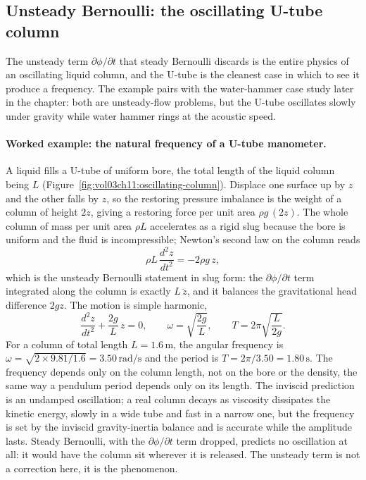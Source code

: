 \subsection{Unsteady Bernoulli: the oscillating U-tube column}

The unsteady term $\partial\phi/\partial t$ that steady Bernoulli
discards is the entire physics of an oscillating liquid column, and
the U-tube is the cleanest case in which to see it produce a
frequency. The example pairs with the water-hammer case study later in
the chapter: both are unsteady-flow problems, but the U-tube oscillates
slowly under gravity while water hammer rings at the acoustic speed.



\paragraph{Worked example: the natural frequency of a U-tube
manometer.} A liquid fills a U-tube of uniform bore, the total length
of the liquid column being $L$ (Figure~\ref{fig:vol03ch11:oscillating-column}).
Displace one surface up by $z$ and the other falls by $z$, so the
restoring pressure imbalance is the weight of a column of height $2z$,
giving a restoring force per unit area $\rho g\,(2z)$. The whole
column of mass per unit area $\rho L$ accelerates as a rigid slug
because the bore is uniform and the fluid is incompressible; Newton's
second law on the column reads
\[
\rho L\,\frac{d^2 z}{dt^2} = -2\rho g\,z,
\]
which is the unsteady Bernoulli statement in slug form: the
$\partial\phi/\partial t$ term integrated along the column is exactly
$L\,\ddot z$, and it balances the gravitational head difference
$2gz$. The motion is simple harmonic,
\[
\frac{d^2 z}{dt^2} + \frac{2g}{L}\,z = 0,
\qquad
\omega = \sqrt{\frac{2g}{L}},
\qquad
T = 2\pi\sqrt{\frac{L}{2g}}.
\]
For a column of total length $L = 1.6\,\si{\meter}$, the angular
frequency is $\omega = \sqrt{2\times 9.81/1.6} = 3.50\,\si{\radian\per
\second}$ and the period is $T = 2\pi/3.50 = 1.80\,\si{\second}$. The
frequency depends only on the column length, not on the bore or the
density, the same way a pendulum period depends only on its length.
The inviscid prediction is an undamped oscillation; a real column
decays as viscosity dissipates the kinetic energy, slowly in a wide
tube and fast in a narrow one, but the frequency is set by the
inviscid gravity-inertia balance and is accurate while the amplitude
lasts. Steady Bernoulli, with the $\partial\phi/\partial t$ term
dropped, predicts no oscillation at all: it would have the column sit
wherever it is released. The unsteady term is not a correction here,
it is the phenomenon.

